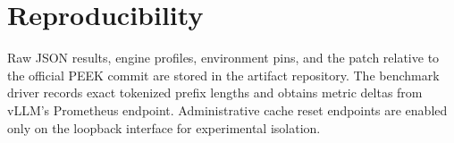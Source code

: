 \documentclass[10pt,twocolumn]{article}
\begin{document}
\section{Reproducibility}

Raw JSON results, engine profiles, environment pins, and the patch relative to
the official PEEK commit are stored in the artifact repository. The benchmark
driver records exact tokenized prefix lengths and obtains metric deltas from
vLLM's Prometheus endpoint. Administrative cache reset endpoints are enabled
only on the loopback interface for experimental isolation.
\end{document}
